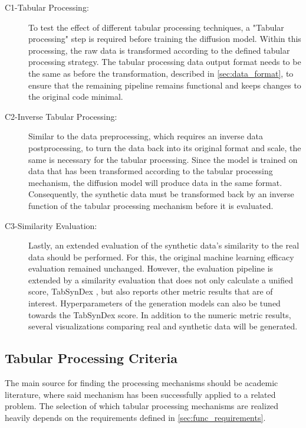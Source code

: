 \begin{description}
	\item[C1-Tabular Processing:] To test the effect of different tabular processing techniques, a "Tabular processing" step is required before training the diffusion model.
		Within this processing, the raw data is transformed according to the defined tabular processing strategy.
		The tabular processing data output format needs to be the same as before the transformation, described in \autoref{sec:data_format}, to ensure
		that the remaining pipeline remains functional and keeps changes to the original code minimal.
	\item[C2-Inverse Tabular Processing:] Similar to the data preprocessing, which requires an inverse data postprocessing, to turn the data back into its original format and scale, the same is necessary for the tabular processing.
		Since the model is trained on data that has been transformed according to the tabular processing mechanism, the diffusion model will produce data in the same format.
		Consequently, the synthetic data must be transformed back by an inverse function of the tabular processing mechanism before it is evaluated.
	\item[C3-Similarity Evaluation:] Lastly, an extended evaluation of the synthetic data's similarity to the real data should be performed.
		For this, the original machine learning efficacy evaluation remained unchanged.
		However, the evaluation pipeline is extended by a similarity evaluation that does not only calculate a unified score, TabSynDex \cite{chundawat2022UniversalMetricRobust}, but also reports other metric results that are of interest.
		Hyperparameters of the generation models can also be tuned towards the TabSynDex score.
		In addition to the numeric metric results, several visualizations comparing real and synthetic data will be generated.
\end{description}

\subsection{Tabular Processing Criteria}
\label{ch:Concept-criteria}

The main source for finding the processing mechanisms should be academic literature, where said mechanism has been successfully applied to a related problem.
The selection of which tabular processing mechanisms are realized heavily depends on the requirements defined in \autoref{sec:func_requirements}.

